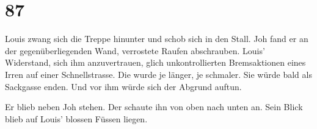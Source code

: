 \chapter{87}



Louis zwang sich die Treppe hinunter und schob sich in den Stall. Joh
fand er an der gegenüberliegenden Wand, verrostete Raufen abschrauben.
Louis’ Widerstand, sich ihm anzuvertrauen, glich unkontrollierten
Bremsaktionen eines Irren auf einer Schnellstrasse. Die wurde je länger,
je schmaler. Sie würde bald als Sackgasse enden. Und vor ihm würde sich
der Abgrund auftun.

Er blieb neben Joh stehen. Der schaute ihn von oben nach unten an.
Sein Blick blieb auf Louis’ blossen Füssen liegen.
